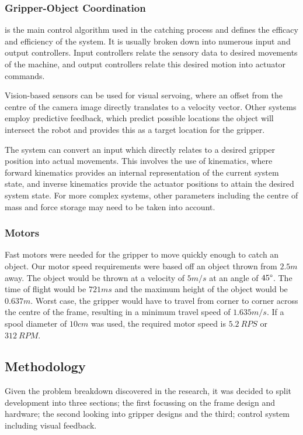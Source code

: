 \documentclass[conference]{IEEEtran}
\begin{document}
\subsubsection{Gripper-Object Coordination}
is the main control algorithm used in the catching process and defines the efficacy and efficiency of the system. It is usually broken down into numerous input and output controllers. Input controllers relate the sensory data to desired movements of the machine, and output controllers relate this desired motion into actuator commands.

Vision-based sensors can be used for visual servoing, where an offset from the centre of the camera image directly translates to a velocity vector. Other systems employ predictive feedback, which predict possible locations the object will intersect the robot and provides this as a target location for the gripper.

The system can convert an input which directly relates to a desired gripper position into actual movements. This involves the use of kinematics, where forward kinematics provides an internal representation of the current system state, and inverse kinematics provide the actuator positions to attain the desired system state. For more complex systems, other parameters including the centre of mass and force storage may need to be taken into account. 

\subsubsection{Motors}\label{motorSpeedRequired}
Fast motors were needed for the gripper to move quickly enough to catch an object. Our motor speed requirements were based off an object thrown from $2.5m$ away. The object would be thrown at a velocity of $5m/s$ at an angle of $45\degree$. The time of flight would be $721ms$ and the maximum height of the object would be $0.637m$. Worst case, the gripper would have to travel from corner to corner across the centre of the frame, resulting in a minimum travel speed of $1.635m/s$. If a spool diameter of $10cm$ was used, the required motor speed is $5.2\ RPS$ or $312\ RPM$.

\subsection{Methodology}
Given the problem breakdown discovered in the research, it was decided to split development into three sections; the first focussing on the frame design and hardware; the second looking into gripper designs and the third; control system including visual feedback.
\end{document}
